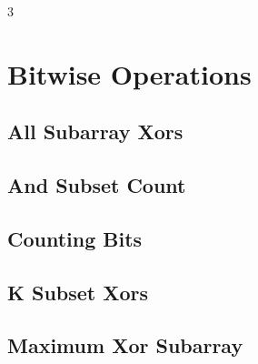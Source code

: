 \documentclass[8pt]{extarticle}
\begin{document}
\begin{multicols*}{3}

\section{Bitwise Operations}

\subsection{All Subarray Xors}
\begin{caixaenunciado}

\end{caixaenunciado}
\vspace{0.3cm}


\subsection{And Subset Count}
\begin{caixaenunciado}

\end{caixaenunciado}
\vspace{0.3cm}


\subsection{Counting Bits}
\begin{caixaenunciado}

\end{caixaenunciado}
\vspace{0.3cm}


\subsection{K Subset Xors}
\begin{caixaenunciado}

\end{caixaenunciado}
\vspace{0.3cm}


\subsection{Maximum Xor Subarray}
\begin{caixaenunciado}

\end{caixaenunciado}
\vspace{0.3cm}



\end{multicols*}
\end{document}
